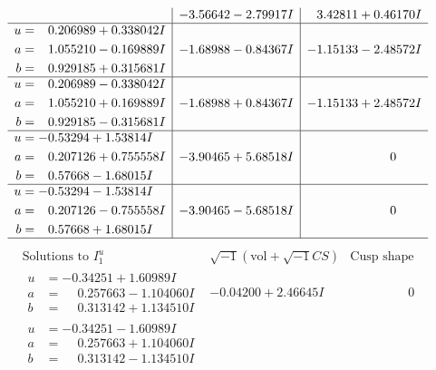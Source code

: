 \documentclass[1p]{elsarticle_modified}
\theoremstyle{definition}
\newcommand{\I}{\sqrt{-1}}
\begin{document}
$$\begin{array}{c|c|c}
 & -3.56642 - 2.79917 I & \phantom{-}3.42811 + 0.46170 I \\ \hline\begin{aligned}
u &= \phantom{-}0.206989 + 0.338042 I \\
a &= \phantom{-}1.055210 - 0.169889 I \\
b &= \phantom{-}0.929185 + 0.315681 I\end{aligned}
 & -1.68988 - 0.84367 I & -1.15133 - 2.48572 I \\ \hline\begin{aligned}
u &= \phantom{-}0.206989 - 0.338042 I \\
a &= \phantom{-}1.055210 + 0.169889 I \\
b &= \phantom{-}0.929185 - 0.315681 I\end{aligned}
 & -1.68988 + 0.84367 I & -1.15133 + 2.48572 I \\ \hline\begin{aligned}
u &= -0.53294 + 1.53814 I \\
a &= \phantom{-}0.207126 + 0.755558 I \\
b &= \phantom{-}0.57668 - 1.68015 I\end{aligned}
 & -3.90465 + 5.68518 I & \phantom{-0.000000 } 0 \\ \hline\begin{aligned}
u &= -0.53294 - 1.53814 I \\
a &= \phantom{-}0.207126 - 0.755558 I \\
b &= \phantom{-}0.57668 + 1.68015 I\end{aligned}
 & -3.90465 - 5.68518 I & \phantom{-0.000000 } 0\\
 \hline 
 \end{array}$$\newpage$$\begin{array}{c|c|c}  
\text{Solutions to }I^u_{1}& \I (\text{vol} + \sqrt{-1}CS) & \text{Cusp shape}\\
 \hline 
\begin{aligned}
u &= -0.34251 + 1.60989 I \\
a &= \phantom{-}0.257663 - 1.104060 I \\
b &= \phantom{-}0.313142 + 1.134510 I\end{aligned}
 & -0.04200 + 2.46645 I & \phantom{-0.000000 } 0 \\ \hline\begin{aligned}
u &= -0.34251 - 1.60989 I \\
a &= \phantom{-}0.257663 + 1.104060 I \\
b &= \phantom{-}0.313142 - 1.134510 I\end{aligned}

\end{array}$$
\end{document}
